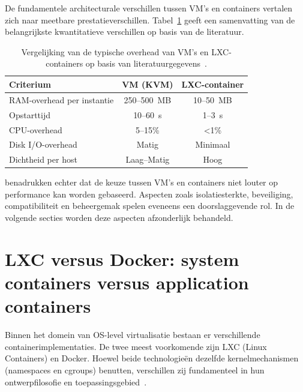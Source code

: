 De fundamentele architecturale verschillen tussen VM's en containers vertalen zich naar meetbare prestatieverschillen. Tabel~\ref{tab:vm-vs-container-overhead} geeft een samenvatting van de belangrijkste kwantitatieve verschillen op basis van de literatuur.

\begin{table}[h]
    \centering
    \caption[Overhead VM's vs.\ containers]{Vergelijking van de typische overhead van VM's en LXC-containers op basis van literatuurgegevens~\autocite{LogicWeb2025, Felter2015, TechOpt2025}.}
    \label{tab:vm-vs-container-overhead}
    \begin{tabular}{lcc}
        \toprule
        \textbf{Criterium} & \textbf{VM (KVM)} & \textbf{LXC-container} \\
        \midrule
        RAM-overhead per instantie   & 250--500~MB  & 10--50~MB  \\
        Opstarttijd                  & 10--60~s     & 1--3~s     \\
        CPU-overhead                 & 5--15\%      & <1\%       \\
        Disk I/O-overhead            & Matig        & Minimaal   \\
        Dichtheid per host           & Laag--Matig  & Hoog       \\
        \bottomrule
    \end{tabular}
\end{table}

\textcite{ArXiv2023Convergence} benadrukken echter dat de keuze tussen VM's en containers niet louter op performance kan worden gebaseerd. Aspecten zoals isolatiesterkte, beveiliging, compatibiliteit en beheergemak spelen eveneens een doorslaggevende rol. In de volgende secties worden deze aspecten afzonderlijk behandeld.

\section{LXC versus Docker: system containers versus application containers}
\label{sec:lxc-versus-docker}

Binnen het domein van OS-level virtualisatie bestaan er verschillende containerimplementaties. De twee meest voorkomende zijn LXC (Linux Containers) en Docker. Hoewel beide technologieën dezelfde kernelmechanismen (namespaces en cgroups) benutten, verschillen zij fundamenteel in hun ontwerpfilosofie en toepassingsgebied~\autocite{Merkel2014, Soltesz2007}.

